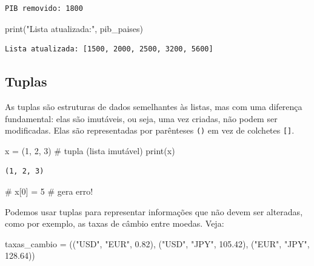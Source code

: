 \documentclass[
  portuguese,
  letterpaper,
  DIV=11,
  numbers=noendperiod]{scrreprt}
\newenvironment{Shaded}{\begin{snugshade}}{\end{snugshade}}
\newcommand{\BuiltInTok}[1]{\textcolor[rgb]{0.00,0.23,0.31}{#1}}
\newcommand{\CommentTok}[1]{\textcolor[rgb]{0.37,0.37,0.37}{#1}}
\newcommand{\DecValTok}[1]{\textcolor[rgb]{0.68,0.00,0.00}{#1}}
\newcommand{\FloatTok}[1]{\textcolor[rgb]{0.68,0.00,0.00}{#1}}
\newcommand{\NormalTok}[1]{\textcolor[rgb]{0.00,0.23,0.31}{#1}}
\newcommand{\OperatorTok}[1]{\textcolor[rgb]{0.37,0.37,0.37}{#1}}
\newcommand{\StringTok}[1]{\textcolor[rgb]{0.13,0.47,0.30}{#1}}
\theoremstyle{definition}
\theoremstyle{remark}
\begin{document}
\begin{verbatim}
PIB removido: 1800
\end{verbatim}

\begin{Shaded}
\begin{Highlighting}[]
\BuiltInTok{print}\NormalTok{(}\StringTok{"Lista atualizada:"}\NormalTok{, pib\_paises)}
\end{Highlighting}
\end{Shaded}

\begin{verbatim}
Lista atualizada: [1500, 2000, 2500, 3200, 5600]
\end{verbatim}

\subsection{Tuplas}\label{tuplas}

As tuplas são estruturas de dados semelhantes às listas, mas com uma
diferença fundamental: elas são imutáveis, ou seja, uma vez criadas, não
podem ser modificadas. Elas são representadas por parênteses \texttt{()}
em vez de colchetes \texttt{{[}{]}}.

\begin{Shaded}
\begin{Highlighting}[]
\NormalTok{x }\OperatorTok{=}\NormalTok{ (}\DecValTok{1}\NormalTok{, }\DecValTok{2}\NormalTok{, }\DecValTok{3}\NormalTok{) }\CommentTok{\# tupla (lista imutável)}
\BuiltInTok{print}\NormalTok{(x)}
\end{Highlighting}
\end{Shaded}

\begin{verbatim}
(1, 2, 3)
\end{verbatim}

\begin{Shaded}
\begin{Highlighting}[]

\CommentTok{\# x[0] = 5 \# gera erro!}
\end{Highlighting}
\end{Shaded}

Podemos usar tuplas para representar informações que não devem ser
alteradas, como por exemplo, as taxas de câmbio entre moedas. Veja:

\begin{Shaded}
\begin{Highlighting}[]
\NormalTok{taxas\_cambio }\OperatorTok{=}\NormalTok{ ((}\StringTok{"USD"}\NormalTok{, }\StringTok{"EUR"}\NormalTok{, }\FloatTok{0.82}\NormalTok{), (}\StringTok{"USD"}\NormalTok{, }\StringTok{"JPY"}\NormalTok{, }\FloatTok{105.42}\NormalTok{), (}\StringTok{"EUR"}\NormalTok{, }\StringTok{"JPY"}\NormalTok{, }\FloatTok{128.64}\NormalTok{))}
\end{Highlighting}
\end{Shaded}
\end{document}
